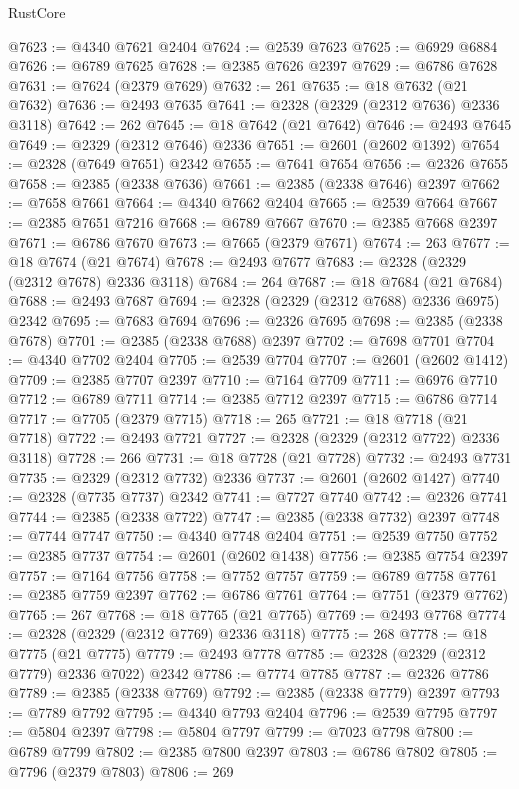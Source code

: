 \begin{lexlean}{RustCore}
\begin{coremodule}
@7623 := @4340 @7621 @2404
@7624 := @2539 @7623
@7625 := @6929 @6884
@7626 := @6789 @7625
@7628 := @2385 @7626 @2397
@7629 := @6786 @7628
@7631 := @7624 (@2379 @7629)
@7632 := 261
@7635 := @18 @7632 (@21 @7632)
@7636 := @2493 @7635
@7641 := @2328 (@2329 (@2312 @7636) @2336 @3118)
@7642 := 262
@7645 := @18 @7642 (@21 @7642)
@7646 := @2493 @7645
@7649 := @2329 (@2312 @7646) @2336
@7651 := @2601 (@2602 @1392)
@7654 := @2328 (@7649 @7651) @2342
@7655 := @7641 @7654
@7656 := @2326 @7655
@7658 := @2385 (@2338 @7636)
@7661 := @2385 (@2338 @7646) @2397
@7662 := @7658 @7661
@7664 := @4340 @7662 @2404
@7665 := @2539 @7664
@7667 := @2385 @7651 @7216
@7668 := @6789 @7667
@7670 := @2385 @7668 @2397
@7671 := @6786 @7670
@7673 := @7665 (@2379 @7671)
@7674 := 263
@7677 := @18 @7674 (@21 @7674)
@7678 := @2493 @7677
@7683 := @2328 (@2329 (@2312 @7678) @2336 @3118)
@7684 := 264
@7687 := @18 @7684 (@21 @7684)
@7688 := @2493 @7687
@7694 := @2328 (@2329 (@2312 @7688) @2336 @6975) @2342
@7695 := @7683 @7694
@7696 := @2326 @7695
@7698 := @2385 (@2338 @7678)
@7701 := @2385 (@2338 @7688) @2397
@7702 := @7698 @7701
@7704 := @4340 @7702 @2404
@7705 := @2539 @7704
@7707 := @2601 (@2602 @1412)
@7709 := @2385 @7707 @2397
@7710 := @7164 @7709
@7711 := @6976 @7710
@7712 := @6789 @7711
@7714 := @2385 @7712 @2397
@7715 := @6786 @7714
@7717 := @7705 (@2379 @7715)
@7718 := 265
@7721 := @18 @7718 (@21 @7718)
@7722 := @2493 @7721
@7727 := @2328 (@2329 (@2312 @7722) @2336 @3118)
@7728 := 266
@7731 := @18 @7728 (@21 @7728)
@7732 := @2493 @7731
@7735 := @2329 (@2312 @7732) @2336
@7737 := @2601 (@2602 @1427)
@7740 := @2328 (@7735 @7737) @2342
@7741 := @7727 @7740
@7742 := @2326 @7741
@7744 := @2385 (@2338 @7722)
@7747 := @2385 (@2338 @7732) @2397
@7748 := @7744 @7747
@7750 := @4340 @7748 @2404
@7751 := @2539 @7750
@7752 := @2385 @7737
@7754 := @2601 (@2602 @1438)
@7756 := @2385 @7754 @2397
@7757 := @7164 @7756
@7758 := @7752 @7757
@7759 := @6789 @7758
@7761 := @2385 @7759 @2397
@7762 := @6786 @7761
@7764 := @7751 (@2379 @7762)
@7765 := 267
@7768 := @18 @7765 (@21 @7765)
@7769 := @2493 @7768
@7774 := @2328 (@2329 (@2312 @7769) @2336 @3118)
@7775 := 268
@7778 := @18 @7775 (@21 @7775)
@7779 := @2493 @7778
@7785 := @2328 (@2329 (@2312 @7779) @2336 @7022) @2342
@7786 := @7774 @7785
@7787 := @2326 @7786
@7789 := @2385 (@2338 @7769)
@7792 := @2385 (@2338 @7779) @2397
@7793 := @7789 @7792
@7795 := @4340 @7793 @2404
@7796 := @2539 @7795
@7797 := @5804 @2397
@7798 := @5804 @7797
@7799 := @7023 @7798
@7800 := @6789 @7799
@7802 := @2385 @7800 @2397
@7803 := @6786 @7802
@7805 := @7796 (@2379 @7803)
@7806 := 269

\end{coremodule}
\end{lexlean}
